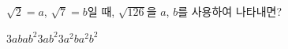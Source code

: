 $\sqrt{2}=a$, $\sqrt{7}=b$일 때, $\sqrt{126}$을 $a$, $b$를 사용하여 나타내면?
\begin{choices32}{$3ab$}{$ab^2$}{$3ab^2$}{$3a^2b$}{$a^2b^2$}\end{choices32}

